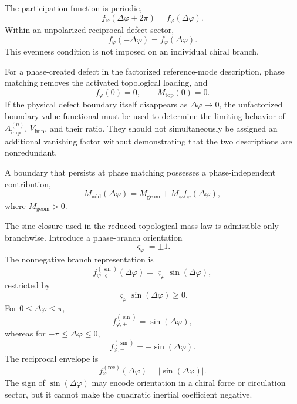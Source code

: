 The participation function is periodic,
\begin{equation}
    f_{\varphi}(\Delta\varphi+2\pi)
    =
    f_{\varphi}(\Delta\varphi).
\end{equation}
Within an unpolarized reciprocal defect sector,
\begin{equation}
    f_{\varphi}(-\Delta\varphi)
    =
    f_{\varphi}(\Delta\varphi).
\end{equation}
This evenness condition is not imposed on an individual chiral branch.

For a phase-created defect in the factorized reference-mode description, phase matching removes the activated topological loading, and
\begin{equation}
    f_{\varphi}(0)=0,
    \qquad
    M_{\mathrm{top}}(0)=0.
\end{equation}
If the physical defect boundary itself disappears as \(\Delta\varphi\rightarrow0\), the unfactorized boundary-value functional must be used to determine the limiting behavior of \(A_{\mathrm{imp}}^{(n)}\), \(V_{\mathrm{imp}}\), and their ratio. They should not simultaneously be assigned an additional vanishing factor without demonstrating that the two descriptions are nonredundant.

A boundary that persists at phase matching possesses a phase-independent contribution,
\begin{equation}
    M_{\mathrm{add}}(\Delta\varphi)
    =
    M_{\mathrm{geom}}
    +M_{\varphi}f_{\varphi}(\Delta\varphi),
\end{equation}
where \(M_{\mathrm{geom}}>0\).

The sine closure used in the reduced topological mass law is admissible only branchwise. Introduce a phase-branch orientation
\begin{equation}
    \varsigma_{\varphi}=\pm1.
\end{equation}
The nonnegative branch representation is
\begin{equation}
    f_{\varphi,\varsigma}^{(\sin)}(\Delta\varphi)
    =
    \varsigma_{\varphi}\sin(\Delta\varphi),
\end{equation}
restricted by
\begin{equation}
    \varsigma_{\varphi}\sin(\Delta\varphi)\geq0.
\end{equation}
For \(0\leq\Delta\varphi\leq\pi\),
\begin{equation}
    f_{\varphi,+}^{(\sin)}=\sin(\Delta\varphi),
\end{equation}
whereas for \(-\pi\leq\Delta\varphi\leq0\),
\begin{equation}
    f_{\varphi,-}^{(\sin)}=-\sin(\Delta\varphi).
\end{equation}
The reciprocal envelope is
\begin{equation}
    f_{\varphi}^{(\mathrm{rec})}(\Delta\varphi)
    =
    |\sin(\Delta\varphi)|.
\end{equation}
The sign of \(\sin(\Delta\varphi)\) may encode orientation in a chiral force or circulation sector, but it cannot make the quadratic inertial coefficient negative.

